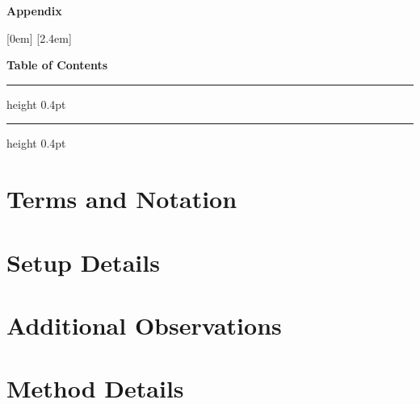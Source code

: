 
{\centering \LARGE\bfseries Appendix\par}
\vspace{3em}
{\setlength{\parskip}{0pt}%
 \hypersetup{linkcolor=black}%
 [0em]{\addvspace{5pt}\bfseries}{\thecontentslabel\quad}{}{\enspace{}\contentspage}
 [2.4em]{\addvspace{1pt}}{\thecontentslabel\quad}{}{\enspace{}\contentspage}%
 {\bfseries\large Table of Contents\par}
 \vspace{4pt}\hrule height 0.4pt\vspace{8pt}
 \vspace{8pt}\hrule height 0.4pt}

\renewcommand\thefigure{S\arabic{figure}}
\renewcommand\thetable{S\arabic{table}}
\renewcommand{\theHfigure}{S\arabic{figure}}
\renewcommand{\theHtable}{S\arabic{table}}
\setcounter{table}{0}
\setcounter{figure}{0}
\setcounter{equation}{0}
\renewcommand\theequation{S\arabic{equation}}

\newpage
\section{Terms and Notation}\label{apdx:notation}


\newpage

\section{Setup Details}\label{apdx:setup_details}

\vspace{-8pt}




\newpage

\section{Additional Observations}\label{apdx:observations}







\section{Method Details}\label{apdx:method}







